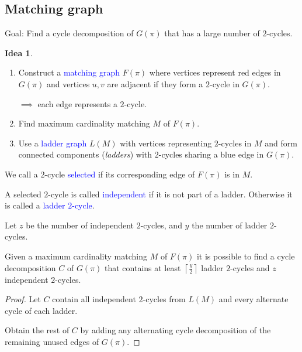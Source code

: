 \documentclass{beamer}
\theoremstyle{definition}
\newtheorem{idea}[theorem]{Idea}
\def\spadding{\vspace{0.25cm}}
\def\b{\textcolor{blue}}
\begin{document}
\subsection{Matching graph}

\begin{frame}

Goal: Find a cycle decomposition of $G(\pi)$ that has a large number of $2$-cycles.\pause

\begin{idea}
\begin{enumerate}
    \item Construct a \b{matching graph} $F(\pi)$ where vertices represent red edges in $G(\pi)$ and vertices $u, v$ are adjacent if they form a $2$-cycle in $G(\pi)$. \par\pause
          $\implies$ each edge represents a $2$-cycle.\pause
    \item Find maximum cardinality matching $M$ of $F(\pi)$.\pause
    \item Use a \b{ladder graph} $L(M)$ with vertices representing $2$-cycles in $M$ and form connected components (\textit{ladders}) with $2$-cycles sharing a blue edge in $G(\pi)$.
\end{enumerate}
\end{idea}

\end{frame}

\begin{frame}

\begin{definition}
We call a $2$-cycle \b{selected} if its corresponding edge of $F(\pi)$ is in $M$.\pause\spadding

A selected $2$-cycle is called \b{independent} if it is not part of a ladder. Otherwise it is called a \b{ladder $2$-cycle}.
\end{definition}

\end{frame}

\begin{frame}

Let $z$ be the number of independent $2$-cycles, and $y$ the number of ladder $2$-cycles.\pause

\begin{theorem}
\label{thm:5}
Given a maximum cardinality matching $M$ of $F(\pi)$ it is possible to find a cycle decomposition $C$ of $G(\pi)$ that contains at least $\left\lceil \frac{y}{2} \right\rceil$ ladder $2$-cycles and $z$ independent $2$-cycles.
\end{theorem}

\begin{proof}
Let $C$ contain all independent $2$-cycles from $L(M)$ and every alternate cycle of each ladder. \par\pause
Obtain the rest of $C$ by adding any alternating cycle decomposition of the remaining unused edges of $G(\pi)$.
\end{proof}

\end{frame}
\end{document}
